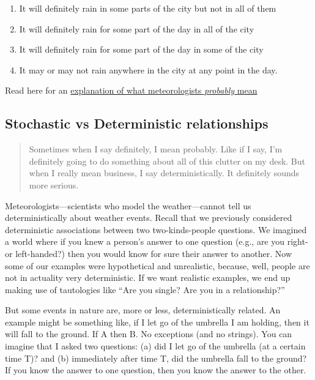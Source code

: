 \documentclass[openany]{book}
\providecommand{\tightlist}{%
  \setlength{\itemsep}{0pt}\setlength{\parskip}{0pt}}
\begin{document}
\begin{enumerate}
\def\labelenumi{\alph{enumi})}
\tightlist
\item
  It will definitely rain in some parts of the city but not in all of them
\item
  It will definitely rain for some part of the day in all of the city
\item
  It will definitely rain for some part of the day in some of the city
\item
  It may or may not rain anywhere in the city at any point in the day.
\end{enumerate}

Read here for an \href{http://wxbrad.com/why-a-50-chance-of-rain-usually-means-a-100-chance-of-confusion/}{explanation of what meteorologists \emph{probably} mean}

\hypertarget{stochastic-vs-deterministic-relationships}{%
\subsection*{Stochastic vs Deterministic relationships}\label{stochastic-vs-deterministic-relationships}}

\begin{quote}
Sometimes when I say definitely, I mean probably. Like if I say, I'm definitely going to do something about all of this clutter on my desk. But when I really mean business, I say deterministically. It definitely sounds more serious.
\end{quote}

Meteorologists---scientists who model the weather---cannot tell us deterministically about weather events. Recall that we previously considered deterministic associations between two two-kinds-people questions. We imagined a world where if you knew a person's answer to one question (e.g., are you right- or left-handed?) then you would know for sure their answer to another. Now some of our examples were hypothetical and unrealistic, because, well, people are not in actuality very deterministic. If we want realistic examples, we end up making use of tautologies like ``Are you single? Are you in a relationship?''

But some events in nature are, more or less, deterministically related. An example might be something like, if I let go of the umbrella I am holding, then it will fall to the ground. If A then B. No exceptions (and no strings). You can imagine that I asked two questions: (a) did I let go of the umbrella (at a certain time T)? and (b) immediately after time T, did the umbrella fall to the ground? If you know the answer to one question, then you know the answer to the other.
\end{document}
